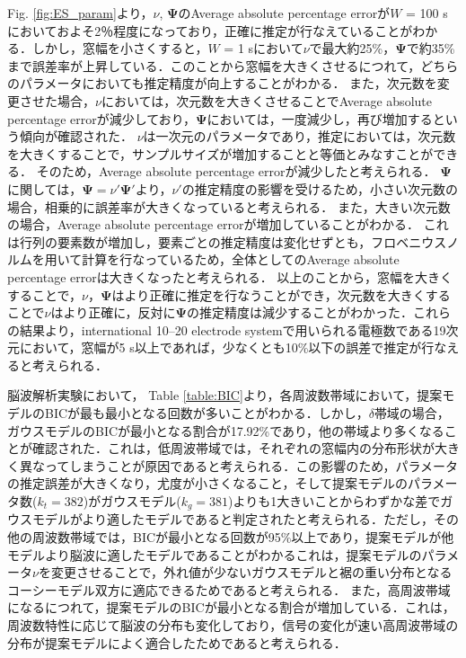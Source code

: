 \documentclass[journal]{IEEEtran}
\begin{document}
Fig. \ref{fig:ES_param}より，$\nu$, $\mathbf{\Psi}$のAverage absolute percentage errorが$W$ = 100 sにおいておよそ2％程度になっており，正確に推定が行なえていることがわかる．しかし，窓幅を小さくすると，$W$ = 1 sにおいて$\nu$で最大約25\%，$\mathbf{\Psi}$で約35\%まで誤差率が上昇している．このことから窓幅を大きくさせるにつれて，どちらのパラメータにおいても推定精度が向上することがわかる．
また，次元数を変更させた場合，$\nu$においては，次元数を大きくさせることでAverage absolute percentage errorが減少しており，$\mathbf{\Psi}$においては，一度減少し，再び増加するという傾向が確認された．
$\nu$は一次元のパラメータであり，推定においては，次元数を大きくすることで，サンプルサイズが増加することと等価とみなすことができる．
そのため，Average absolute percentage errorが減少したと考えられる．
$\mathbf{\Psi}$に関しては，$\mathbf{\Psi} = \nu' \mathbf{\Psi}'$より，$\nu'$の推定精度の影響を受けるため，小さい次元数の場合，相乗的に誤差率が大きくなっていると考えられる．
また，大きい次元数の場合，Average absolute percentage errorが増加していることがわかる．
これは行列の要素数が増加し，要素ごとの推定精度は変化せずとも，フロベニウスノルムを用いて計算を行なっているため，全体としてのAverage absolute percentage errorは大きくなったと考えられる．
以上のことから，窓幅を大きくすることで，$\nu$，$\mathbf{\Psi}$はより正確に推定を行なうことができ，次元数を大きくすることで$\nu$はより正確に，反対に$\mathbf{\Psi}$の推定精度は減少することがわかった．これらの結果より，international 10--20 electrode systemで用いられる電極数である19次元において，窓幅が5 s以上であれば，少なくとも10\%以下の誤差で推定が行なえると考えられる．

脳波解析実験において，
Table \ref{table:BIC}より，各周波数帯域において，提案モデルのBICが最も最小となる回数が多いことがわかる．しかし，$\delta$帯域の場合，ガウスモデルのBICが最小となる割合が17.92\%であり，他の帯域より多くなることが確認された．これは，低周波帯域では，それぞれの窓幅内の分布形状が大きく異なってしまうことが原因であると考えられる．この影響のため，パラメータの推定誤差が大きくなり，尤度が小さくなること，そして提案モデルのパラメータ数($k_t=382$)がガウスモデル($k_g=381$)よりも1大きいことからわずかな差でガウスモデルがより適したモデルであると判定されたと考えられる．ただし，その他の周波数帯域では，BICが最小となる回数が95\%以上であり，提案モデルが他モデルより脳波に適したモデルであることがわかるこれは，提案モデルのパラメータ$\nu$を変更させることで，外れ値が少ないガウスモデルと裾の重い分布となるコーシーモデル双方に適応できるためであると考えられる．
また，高周波帯域になるにつれて，提案モデルのBICが最小となる割合が増加している．これは，周波数特性に応じて脳波の分布も変化しており，信号の変化が速い高周波帯域の分布が提案モデルによく適合したためであると考えられる．
\end{document}
